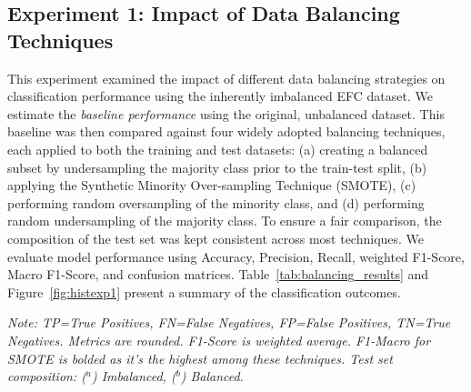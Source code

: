 \documentclass[12pt]{article}
\begin{document}
\subsection{Experiment 1: Impact of Data Balancing Techniques} \label{subsec:experiment_1}

This experiment examined the impact of different data balancing strategies on classification performance using the inherently
imbalanced EFC dataset. We estimate the \emph{baseline performance} using the original, unbalanced dataset.  This baseline
was then compared against four widely adopted balancing techniques, each applied to both the training and test datasets:
(a) creating a balanced subset by undersampling the majority class prior to the train-test split, (b) applying the Synthetic
Minority Over-sampling Technique (SMOTE), (c) performing random oversampling of the minority class, and (d) performing
random undersampling of the majority class. To ensure a fair comparison, the composition of the test set was kept consistent
across most techniques. We evaluate model performance using Accuracy, Precision, Recall, weighted F1-Score, Macro F1-Score,
and confusion matrices. Table~\ref{tab:balancing_results} and Figure~\ref{fig:histexp1} present a summary of the classification outcomes.


\begin{table}[htbp]
  \centering
  \caption{EFC Performance Across Data Balancing Techniques (Experiment 1).}
  \label{tab:balancing_results}
  \par\medskip
  \footnotesize
  \textit{Note: TP=True Positives, FN=False Negatives, FP=False Positives, TN=True Negatives. Metrics are rounded. F1-Score
    is weighted average. F1-Macro for SMOTE is bolded as it's the highest among these techniques. Test set composition:
    ($^{a}$) Imbalanced, ($^{b}$) Balanced.}
\end{table}
\end{document}
